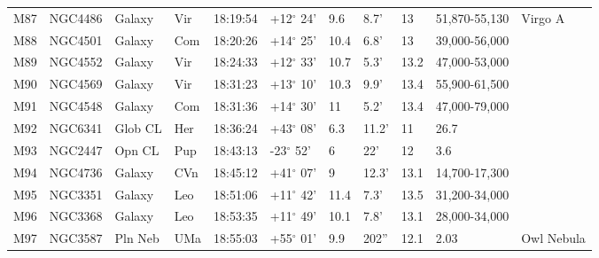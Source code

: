 \documentclass[10pt,twoside,a4paper,english]{article}
\begin{document}
\begin{longtable}{@{}lllllllllll@{}}
M87        & NGC4486     & Galaxy     & Vir       & 18:19:54 & +12$^{\circ}$ 24'  & 9.6       & 8.7'                 & 13       & 51,870-55,130       & Virgo A                                   \\ 
M88        & NGC4501     & Galaxy     & Com       & 18:20:26 & +14$^{\circ}$ 25'  & 10.4      & 6.8'                 & 13       & 39,000-56,000       &                                           \\ 
M89        & NGC4552     & Galaxy     & Vir       & 18:24:33 & +12$^{\circ}$ 33'  & 10.7      & 5.3'                 & 13.2     & 47,000-53,000       &                                           \\ 
M90        & NGC4569     & Galaxy     & Vir       & 18:31:23 & +13$^{\circ}$ 10'  & 10.3      & 9.9'                 & 13.4     & 55,900-61,500       &                                           \\ 
M91        & NGC4548     & Galaxy     & Com       & 18:31:36 & +14$^{\circ}$ 30'  & 11        & 5.2'                 & 13.4     & 47,000-79,000       &                                           \\ 
M92        & NGC6341     & Glob CL    & Her       & 18:36:24 & +43$^{\circ}$ 08'  & 6.3       & 11.2'                & 11       & 26.7                &                                           \\ 
M93        & NGC2447     & Opn CL     & Pup       & 18:43:13 & -23$^{\circ}$ 52'  & 6         & 22'                  & 12       & 3.6                 &                                           \\ 
M94        & NGC4736     & Galaxy     & CVn       & 18:45:12 & +41$^{\circ}$ 07'  & 9         & 12.3'                & 13.1     & 14,700-17,300       &                                           \\ 
M95        & NGC3351     & Galaxy     & Leo       & 18:51:06 & +11$^{\circ}$ 42'  & 11.4      & 7.3'                 & 13.5     & 31,200-34,000       &                                           \\ 
M96        & NGC3368     & Galaxy     & Leo       & 18:53:35 & +11$^{\circ}$ 49'  & 10.1      & 7.8'                 & 13.1     & 28,000-34,000       &                                           \\ 
M97        & NGC3587     & Pln Neb    & UMa       & 18:55:03 & +55$^{\circ}$ 01'  & 9.9       & 202''                & 12.1     & 2.03                & Owl Nebula                                \\ 

\end{longtable}
\end{document}
